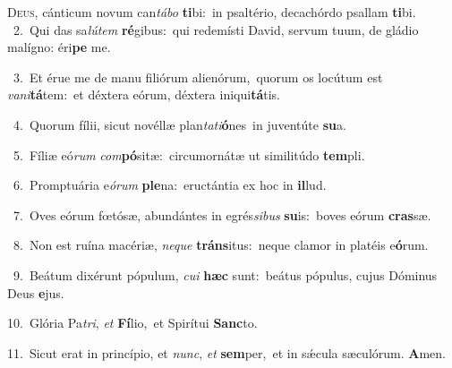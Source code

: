 \lettrine{\initial\textcolor{\initialcolor}{D}}{eus,} cánticum novum can\-\textit{tá}\-\textit{bo} \textbf{ti}\-bi:~\star in psaltério, decachórdo psallam \textbf{ti}\-bi.\\
{\numbfont\textcolor{\numbcolor}{~2.}}~Qui das sa\-\textit{lú}\-\textit{tem} \textbf{ré}\-gibus:~\star qui redemísti David, servum tuum, de gládio malígno: éri\textbf{pe} me.\par
{\numbfont\textcolor{\numbcolor}{~3.}}~Et érue me de manu filiórum alienórum,~\dagger quorum os locútum est \textit{va}\-\textit{ni}\textbf{tá}tem:~\star et déxtera eórum, déxtera iniqui\-\textbf{tá}\-tis.\par
{\numbfont\textcolor{\numbcolor}{~4.}}~Quorum fílii, sicut novéllæ plan\-\textit{ta}\-\textit{ti}\textbf{ó}nes~\star in juventúte \textbf{su}\-a.\par
{\numbfont\textcolor{\numbcolor}{~5.}}~Fíliæ eó\textit{rum} \textit{com}\-\textbf{pó}sitæ:~\star circumornátæ ut similitúdo \textbf{tem}\-pli.\par
{\numbfont\textcolor{\numbcolor}{~6.}}~Promptuária e\-\textit{ó}\-\textit{rum} \textbf{ple}\-na:~\star eructántia ex hoc in \textbf{il}\-lud.\par
{\numbfont\textcolor{\numbcolor}{~7.}}~Oves eórum fœtósæ, abundántes in egrés\-\textit{si}\-\textit{bus} \textbf{su}\-is:~\star boves eórum \textbf{cras}\-sæ.\par
{\numbfont\textcolor{\numbcolor}{~8.}}~Non est ruína macériæ, \textit{ne}\-\textit{que} \textbf{tráns}\-itus:~\star neque clamor in platéis e\-\textbf{ó}\-rum.\par
{\numbfont\textcolor{\numbcolor}{~9.}}~Beátum dixérunt pópulum, \textit{cu}\-\textit{i} \textbf{hæc} sunt:~\star beátus pópulus, cujus Dóminus Deus \textbf{e}\-jus.\par
{\numbfont\textcolor{\numbcolor}{10.}}~Glória Pa\-\textit{tri}\-, \textit{et} \textbf{Fí}\-lio,~\star et Spirítui \textbf{Sanc}\-to.\par
{\numbfont\textcolor{\numbcolor}{11.}}~Sicut erat in princípio, et \textit{nunc}\-, \textit{et} \textbf{sem}\-per,~\star et in sǽcula sæculórum. \textbf{A}\-men.\par
